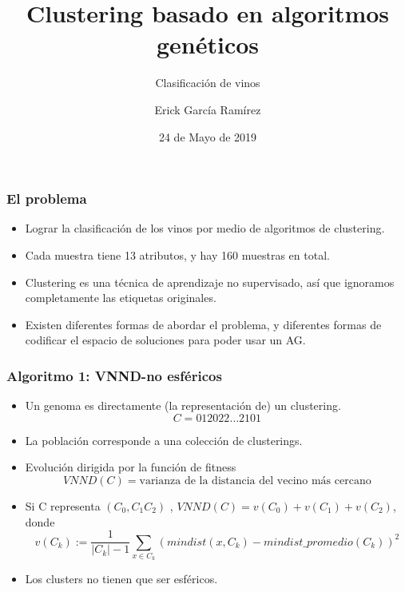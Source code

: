 \documentclass[11pt]{beamer}
\title{Clustering basado en algoritmos genéticos}
\subtitle{Clasificación de vinos}
\author[E. García Ramírez]{Erick García Ramírez}
\institute{Algoritmos Genéticos\\ {\tiny 2019-II MCIC--IIMAS, UNAM}}
\date{24 de Mayo de 2019}
\begin{document}
\begin{frame}
\maketitle
\end{frame}

\begin{frame}
    \frametitle{El problema}
    \begin{itemize}
        \item Lograr la clasificación de los vinos por medio de algoritmos de clustering. 
        \item Cada muestra tiene 13 atributos, y hay 160 muestras en total.
        \item Clustering es una técnica de aprendizaje no supervisado, así que ignoramos completamente las etiquetas
            originales. 
        \item Existen diferentes formas de abordar el problema, y diferentes formas de codificar el espacio de
                soluciones para poder usar un AG. 
    \end{itemize}
\end{frame}
\begin{frame}[fragile]
    \frametitle{Algoritmo 1: VNND-no esféricos}
        \begin{itemize}
            \item Un genoma es directamente (la representación de) un clustering. 
                \[C = 012022\dots2101\]
            \item La población corresponde a una colección de clusterings.
            \item Evolución dirigida por la función de fitness
                \[VNND(C) = \text{varianza de la distancia del vecino más cercano}\]
            \item Si C representa $(C_0, C_1 C_2)$ , $VNND(C) = v(C_0)+v(C_1)+v(C_2)$, donde
                \[v(C_k):=\frac{1}{|C_k|-1} \sum_{x\in C_k} (mindist(x,C_k)-mindist\_promedio(C_k))^2 \]
            \item Los clusters no tienen que ser esféricos.
        \end{itemize}

\end{frame}
\end{document}
